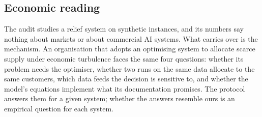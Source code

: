 \documentclass[systems,article,submit,moreauthors,pdftex]{Definitions/mdpi}
\begin{document}
\subsection{Economic reading}
The audit studies a relief system on synthetic instances, and its numbers say nothing about
markets or about commercial AI systems. What carries over is the mechanism. An organisation that
adopts an optimising system to allocate scarce supply under economic turbulence faces the same
four questions: whether its problem needs the optimiser, whether two runs on the same data
allocate to the same customers, which data feeds the decision is sensitive to, and whether the
model's equations implement what its documentation promises. The protocol answers them for a given
system; whether the answers resemble ours is an empirical question for each system.
\end{document}
